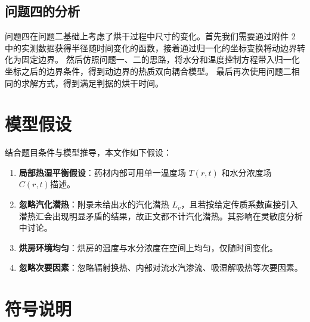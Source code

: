 \documentclass[12pt,a4paper]{article}
\begin{document}
\subsection{问题四的分析}
问题四在问题二基础上考虑了烘干过程中尺寸的变化。首先我们需要通过附件 2 中的实测数据获得半径随时间变化的函数，接着通过归一化的坐标变换将动边界转化为固定边界。
然后仿照问题一、二的思路，将水分和温度控制方程带入归一化坐标之后的边界条件，得到动边界的热质双向耦合模型。
最后再次使用问题二相同的求解方式，得到满足判据的烘干时间。



	
\section{模型假设}
结合题目条件与模型推导，本文作如下假设：
\begin{enumerate}
  
  \item \textbf{局部热湿平衡假设}：药材内部可用单一温度场 \(T(r,t)\) 和水分浓度场 \(C(r,t)\)描述。

  \item \textbf{忽略汽化潜热}：附录未给出水的汽化潜热 \(L_v\)，且若按给定传质系数直接引入潜热汇会出现明显矛盾的结果，故正文都不计汽化潜热。其影响在灵敏度分析中讨论。

  \item \textbf{烘房环境均匀}：烘房的温度与水分浓度在空间上均匀，仅随时间变化。

  \item \textbf{忽略次要因素}：忽略辐射换热、内部对流水汽渗流、吸湿解吸热等次要因素。
\end{enumerate}


\section{符号说明}
\end{document}
